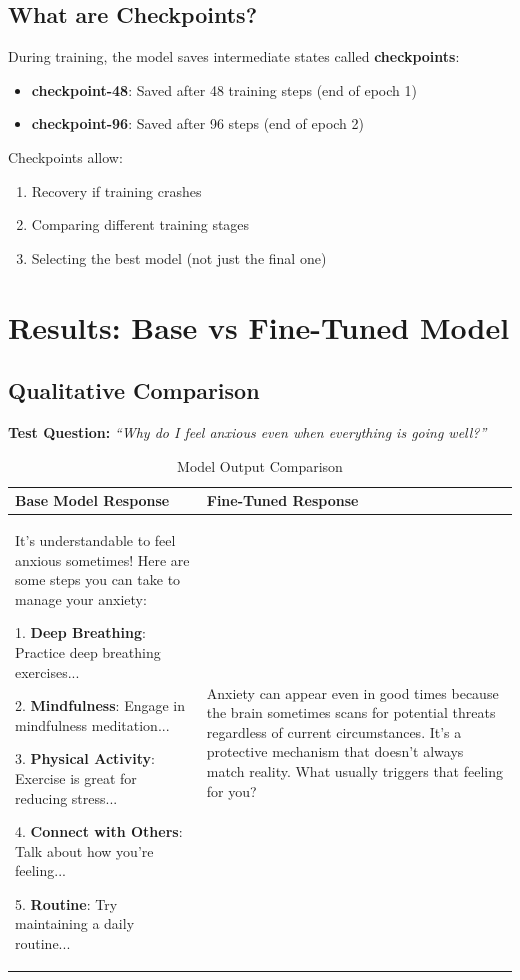\documentclass[12pt,a4paper]{article}
\begin{document}
\subsection{What are Checkpoints?}

During training, the model saves intermediate states called \textbf{checkpoints}:

\begin{itemize}
    \item \textbf{checkpoint-48}: Saved after 48 training steps (end of epoch 1)
    \item \textbf{checkpoint-96}: Saved after 96 steps (end of epoch 2)
\end{itemize}

Checkpoints allow:
\begin{enumerate}
    \item Recovery if training crashes
    \item Comparing different training stages
    \item Selecting the best model (not just the final one)
\end{enumerate}

\section{Results: Base vs Fine-Tuned Model}

\subsection{Qualitative Comparison}

\textbf{Test Question:} \textit{``Why do I feel anxious even when everything is going well?''}

\begin{table}[H]
\centering
\caption{Model Output Comparison}
\small
\begin{tabular}{p{6cm}p{6cm}}
\toprule
\textbf{Base Model Response} & \textbf{Fine-Tuned Response} \\
\midrule
It's understandable to feel anxious sometimes! Here are some steps you can take to manage your anxiety:

1. \textbf{Deep Breathing}: Practice deep breathing exercises...

2. \textbf{Mindfulness}: Engage in mindfulness meditation...

3. \textbf{Physical Activity}: Exercise is great for reducing stress...

4. \textbf{Connect with Others}: Talk about how you're feeling...

5. \textbf{Routine}: Try maintaining a daily routine...
&
Anxiety can appear even in good times because the brain sometimes scans for potential threats regardless of current circumstances. It's a protective mechanism that doesn't always match reality. What usually triggers that feeling for you?
\\
\bottomrule
\end{tabular}
\end{table}
\end{document}
